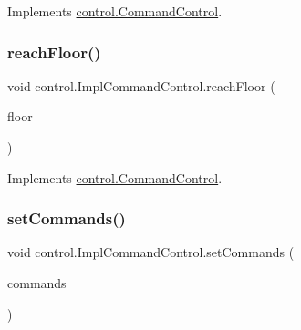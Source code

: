 Implements \mbox{\hyperlink{interfacecontrol_1_1_command_control_abfefcf986aceb87768275e04df3653f5}{control.\+Command\+Control}}.

\mbox{\label{classcontrol_1_1_impl_command_control_a5736ac91cdc39805dc27c6af0c9935cb}} 
\subsubsection{\texorpdfstring{reachFloor()}{reachFloor()}}
{\footnotesize\ttfamily void control.\+Impl\+Command\+Control.\+reach\+Floor (\begin{DoxyParamCaption}\item[{int}]{floor }\end{DoxyParamCaption})}



Implements \mbox{\hyperlink{interfacecontrol_1_1_command_control_aed88af210353f0e854d6da8af1089851}{control.\+Command\+Control}}.

\mbox{\label{classcontrol_1_1_impl_command_control_a4a32b15e589ca6ad5be4d6288f73d0d6}} 
\subsubsection{\texorpdfstring{setCommands()}{setCommands()}}
{\footnotesize\ttfamily void control.\+Impl\+Command\+Control.\+set\+Commands (\begin{DoxyParamCaption}\item[{Navigable\+Set$<$ \mbox{\hyperlink{classcontrol_1_1command_1_1_floor_request}{Floor\+Request}} $>$}]{commands }\end{DoxyParamCaption})}

\mbox{\label{classcontrol_1_1_impl_command_control_a122541d8e0d77a6d9ef62a1ee5391ee9}} 
